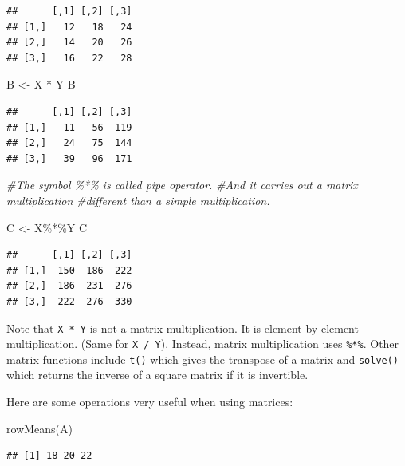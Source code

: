 \documentclass[
]{book}
\newenvironment{Shaded}{\begin{snugshade}}{\end{snugshade}}
\newcommand{\CommentTok}[1]{\textcolor[rgb]{0.56,0.35,0.01}{\textit{#1}}}
\newcommand{\FunctionTok}[1]{\textcolor[rgb]{0.00,0.00,0.00}{#1}}
\newcommand{\NormalTok}[1]{#1}
\newcommand{\OtherTok}[1]{\textcolor[rgb]{0.56,0.35,0.01}{#1}}
\newcommand{\SpecialCharTok}[1]{\textcolor[rgb]{0.00,0.00,0.00}{#1}}
\theoremstyle{definition}
\theoremstyle{definition}
\theoremstyle{definition}
\theoremstyle{definition}
\theoremstyle{remark}
\begin{document}
\begin{verbatim}
##      [,1] [,2] [,3]
## [1,]   12   18   24
## [2,]   14   20   26
## [3,]   16   22   28
\end{verbatim}

\begin{Shaded}
\begin{Highlighting}[]
\NormalTok{B }\OtherTok{\textless{}{-}}\NormalTok{ X }\SpecialCharTok{*}\NormalTok{ Y}
\NormalTok{B}
\end{Highlighting}
\end{Shaded}

\begin{verbatim}
##      [,1] [,2] [,3]
## [1,]   11   56  119
## [2,]   24   75  144
## [3,]   39   96  171
\end{verbatim}

\begin{Shaded}
\begin{Highlighting}[]
\CommentTok{\#The symbol \%*\% is called pipe operator.}
\CommentTok{\#And it carries out a matrix multiplication}
\CommentTok{\#different than a simple multiplication.}

\NormalTok{C }\OtherTok{\textless{}{-}}\NormalTok{ X}\SpecialCharTok{\%*\%}\NormalTok{Y  }
\NormalTok{C}
\end{Highlighting}
\end{Shaded}

\begin{verbatim}
##      [,1] [,2] [,3]
## [1,]  150  186  222
## [2,]  186  231  276
## [3,]  222  276  330
\end{verbatim}

Note that \texttt{X\ *\ Y} is not a matrix multiplication. It is element by element multiplication. (Same for \texttt{X\ /\ Y}). Instead, matrix multiplication uses \texttt{\%*\%}. Other matrix functions include \texttt{t()} which gives the transpose of a matrix and \texttt{solve()} which returns the inverse of a square matrix if it is invertible.

Here are some operations very useful when using matrices:

\begin{Shaded}
\begin{Highlighting}[]
\FunctionTok{rowMeans}\NormalTok{(A)}
\end{Highlighting}
\end{Shaded}

\begin{verbatim}
## [1] 18 20 22
\end{verbatim}
\end{document}
